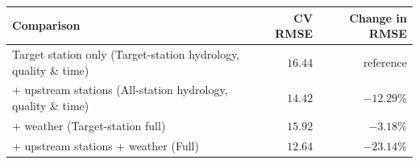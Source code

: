 \begin{tabularx}{\textwidth}{@{}Xrr@{}}
\toprule
\textbf{Comparison} & \textbf{CV RMSE} & \textbf{Change in RMSE} \\
\midrule
Target station only (Target-station hydrology, quality \& time) & $16.44$ & $\text{reference}$ \\
\addlinespace
+ upstream stations (All-station hydrology, quality \& time) & $14.42$ & $-12.29\%$ \\
\addlinespace
+ weather (Target-station full) & $15.92$ & $-3.18\%$ \\
\addlinespace
+ upstream stations + weather (Full) & $12.64$ & $-23.14\%$ \\
\bottomrule
\end{tabularx}
